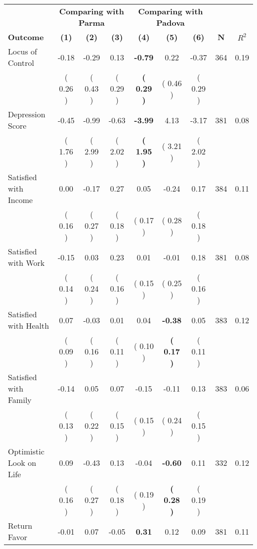 \begin{tabular}{lcccccccc}
\toprule
 & \multicolumn{3}{c}{\textbf{Comparing with Parma}} & \multicolumn{3}{c}{\textbf{Comparing with Padova}} & \\
\cmidrule(lr){2-4} \cmidrule(lr){5-7} 
 \textbf{Outcome} & \textbf{(1)} & \textbf{(2)} & \textbf{(3)} & \textbf{(4)} & \textbf{(5)} & \textbf{(6)} & \textbf{N} & \textbf{$ R^2$} \\
\midrule
Locus of Control &     -0.18 &     -0.29 &      0.13 & \textbf{    -0.79} &      0.22 &     -0.37 & 364 &       0.19 \\ 
 & (     0.26 ) & (     0.43 ) & (     0.29 ) & \textbf{(     0.29 )} & (     0.46 ) & (     0.29 ) & \\
Depression Score &     -0.45 &     -0.99 &     -0.63 & \textbf{    -3.99} &      4.13 &     -3.17 & 381 &       0.08 \\ 
 & (     1.76 ) & (     2.99 ) & (     2.02 ) & \textbf{(     1.95 )} & (     3.21 ) & (     2.02 ) & \\
Satisfied with Income &      0.00 &     -0.17 &      0.27 &      0.05 &     -0.24 &      0.17 & 384 &       0.11 \\ 
 & (     0.16 ) & (     0.27 ) & (     0.18 ) & (     0.17 ) & (     0.28 ) & (     0.18 ) & \\
Satisfied with Work &     -0.15 &      0.03 &      0.23 &      0.01 &     -0.01 &      0.18 & 381 &       0.08 \\ 
 & (     0.14 ) & (     0.24 ) & (     0.16 ) & (     0.15 ) & (     0.25 ) & (     0.16 ) & \\
Satisfied with Health &      0.07 &     -0.03 &      0.01 &      0.04 & \textbf{    -0.38} &      0.05 & 383 &       0.12 \\ 
 & (     0.09 ) & (     0.16 ) & (     0.11 ) & (     0.10 ) & \textbf{(     0.17 )} & (     0.11 ) & \\
Satisfied with Family &     -0.14 &      0.05 &      0.07 &     -0.15 &     -0.11 &      0.13 & 383 &       0.06 \\ 
 & (     0.13 ) & (     0.22 ) & (     0.15 ) & (     0.15 ) & (     0.24 ) & (     0.15 ) & \\
Optimistic Look on Life &      0.09 &     -0.43 &      0.13 &     -0.04 & \textbf{    -0.60} &      0.11 & 332 &       0.12 \\ 
 & (     0.16 ) & (     0.27 ) & (     0.18 ) & (     0.19 ) & \textbf{(     0.28 )} & (     0.19 ) & \\
Return Favor &     -0.01 &      0.07 &     -0.05 & \textbf{     0.31} &      0.12 &      0.09 & 381 &       0.11 \\ 

\end{tabular}
